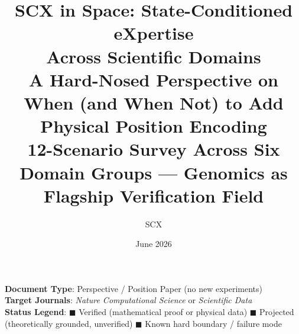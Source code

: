 \documentclass[12pt,a4paper]{article}
\title{
  \textbf{SCX in Space: State-Conditioned eXpertise\\ Across Scientific Domains}\\[8pt]
  \large A Hard-Nosed Perspective on When (and When Not) to Add Physical Position Encoding\\[4pt]
  \normalsize 12-Scenario Survey Across Six Domain Groups — Genomics as Flagship Verification Field
}
\author{SCX}
\date{June 2026}
\begin{document}
\maketitle

\begin{center}
\textbf{Document Type}: Perspective / Position Paper (no new experiments)\\
\textbf{Target Journals}: \textit{Nature Computational Science} or \textit{Scientific Data}\\[6pt]
\textbf{Status Legend}:
\;\textcolor{verified}{$\blacksquare$ Verified (mathematical proof or physical data)}
\;\textcolor{projected}{$\blacksquare$ Projected (theoretically grounded, unverified)}
\;\textcolor{warning}{$\blacksquare$ Known hard boundary / failure mode}
\end{center}
\end{document}

